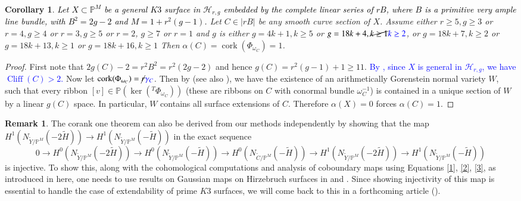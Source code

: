 \documentclass[11pt,twoside]{amsart}
\theoremstyle{plain}
\numberwithin{equation}{section}
\newtheorem{corollary}[theorem]{Corollary}
\theoremstyle{definition}
\newtheorem{remark}[theorem]{Remark}
\begin{document}
\begin{corollary}\label{corank one}
\textcolor{black}{Let $X \subset \mathbb{P}^{M}$ be a general $K3$ surface in $\mathcal{H}_{r,g}$ embedded by the complete linear series of $rB$, where $B$ is a primitive very ample line bundle, with $B^2 = 2g-2$ and $M = 1+r^2(g-1)$.} Let $C \in |rB|$ be any smooth curve section of $X$. Assume either $r \geq 5, g \geq 3$ or $r = 4, g \geq 4$ or $r = 3, g \geq 5$ or $r = 2$, $g \geq 7$ or $r = 1$ and $g$ is either $g = 4k+1, k \geq 5$ or $g = 18k+4, \cancel{k \geq 1} \textcolor{blue}{k \geq 2}$, or $g = 18k+7, k \geq 2$ or $g = 18k+13, k \geq 1$ or $g = 18k+16, k \geq 1$ Then $\alpha(C) = \operatorname{cork}(\Phi_{\omega_C}) = 1$.
\end{corollary}

\begin{proof}
First note that $2g(C)-2 = r^2B^2 = r^2(2g-2)$ and hence $g(C) = r^2(g-1)+1 \geq 11$. \textcolor{blue}{By \cite[Lemma $8.3$]{K01}, since $X$ is general in $\mathcal{H}_{r,g}$, we have $\operatorname{Cliff}(C) > 2$.} Now let $\operatorname{cork}(\Phi_{\omega_C}) = \cancel{r} \textcolor{blue}{\gamma_C}$. Then by \cite[$2.2$, \textcolor{blue}{$2.2.1$}, $2.2.2$]{CDS20} (see also \cite{ABS17}), we have the existence of an arithmetically Gorenstein normal variety $W$, such that every ribbon $[v] \in \mathbb{P}(\operatorname{ker}(^T\Phi_{\omega_C}))$ (these are ribbons on $C$ with conormal bundle $\omega_C^{-1}$) is contained in a unique section of $W$ by a linear $g(C)$ space. In particular, $W$ contains all surface extensions of $C$. Therefore $\alpha(X) = 0$ forces $\alpha(C) = 1$. 
\end{proof}

\begin{remark}{\label{independent corank one}}
The corank one theorem can also be derived from our methods independently by showing that the map $H^1(N_{\widetilde{Y}/\mathbb{P}^M}(-2\widetilde{H})) \to H^1(N_{\widetilde{Y}/\mathbb{P}^M}(-\widetilde{H}))$ in the exact sequence
$$0 \to H^0(N_{\widetilde{Y}/\mathbb{P}^M}(-2\widetilde{H})) \to H^0(N_{\widetilde{Y}/\mathbb{P}^M}(-\widetilde{H})) \to H^0(N_{\widetilde{C}/\mathbb{P}^M}(-\widetilde{H})) \to H^1(N_{\widetilde{Y}/\mathbb{P}^M}(-2\widetilde{H})) \to H^1(N_{\widetilde{Y}/\mathbb{P}^M}(-\widetilde{H}))$$
is injective. To show this, along with the cohomological computations and analysis of coboundary maps using Equations \ref{1}, \ref{2}, \ref{3}, as introduced in here, one needs to use results on Gaussian maps on Hirzebruch surfaces in \cite{DM92} and \cite{DP12}. Since showing injectivity of this map is essential to handle the case of extendability of prime $K3$ surfaces, we will come back to this in a forthcoming article (\cite{BM25}). 
\end{remark}
\end{document}
